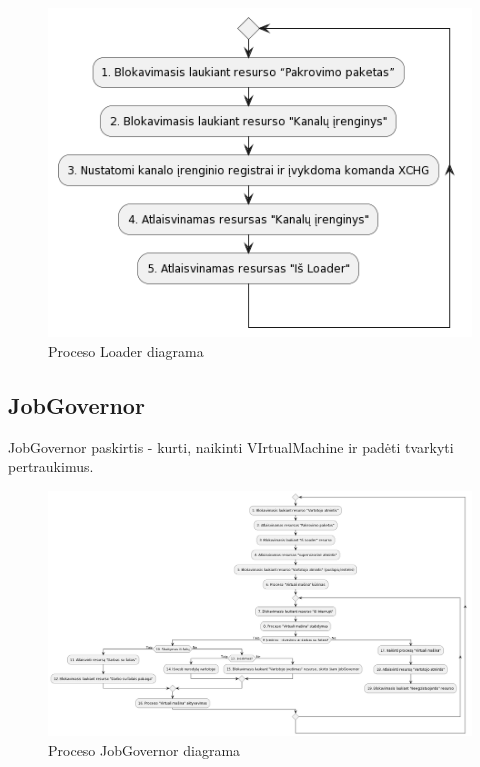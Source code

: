 \documentclass{VUMIFInfKursinis}
\begin{document}
\begin{figure}[H]
	\centering	
	\includegraphics[scale=0.65]{img/Loader}
	\caption{Proceso Loader diagrama}   %
	\label{img:Loader}
\end{figure}

\subsection{JobGovernor}

JobGovernor paskirtis - kurti, naikinti VIrtualMachine ir padėti tvarkyti pertraukimus.

\begin{figure}[H]
	\centering	
	\includegraphics[scale=0.3]{img/JobGovernor}
	\caption{Proceso JobGovernor diagrama}   %
	\label{img:JobGovernor}
\end{figure}
\end{document}
